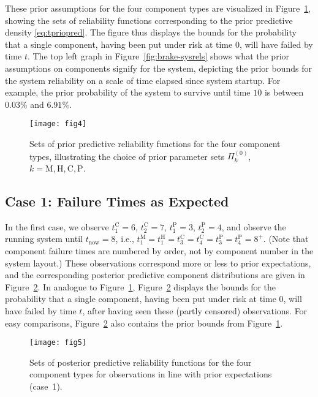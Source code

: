 \documentclass[Journal,letterpaper]{ascelike-new}
\newcommand{\uz}{^{(0)}} %
\def\PkZ{\Pi\uz_k}
\def\tnow{t_\text{now}}
\begin{document}
These prior assumptions for the four component types are visualized in Figure~\ref{fig:brake-comppriors},
showing the sets of reliability functions corresponding to the prior predictive density \eqref{eq:tpriopred}.
The figure thus displays the bounds for the probability that a single component,
having been put under risk at time $0$, will have failed by time $t$.
The top left graph in Figure~\ref{fig:brake-sysrels} shows what the prior assumptions on components
signify for the system, depicting the prior bounds for the system reliability %
on a scale of time elapsed since system startup.
For example, the prior probability of the system to survive until time $10$ is between $0.03$\% and $6.91$\%.

\begin{figure}
\texttt{[image: fig4]}
\caption{Sets of prior predictive reliability functions for the four component types,
illustrating the choice of prior parameter sets $\PkZ$, $k=\text{M}, \text{H}, \text{C}, \text{P}$.}
\label{fig:brake-comppriors}
\end{figure}


\subsection{Case 1: Failure Times as Expected}
\label{sec:ex-case1}

In the first case, we observe $t_1^\text{C} = 6$, $t_2^\text{C} = 7$, $t_1^\text{P} = 3$, $t_2^\text{P} = 4$,
and observe the running system until $\tnow = 8$,
i.e., $t_1^\text{M} = t_1^\text{H} = t_3^\text{C} = t_4^\text{C} = t_3^\text{P} = t_4^\text{P} = 8^+$.
(Note that component failure times are numbered by order, not by component number in the system layout.)
These observations correspond more or less to prior expectations,
and the corresponding posterior predictive component distributions are given in Figure~\ref{fig:comppost-1}.
In analogue to Figure~\ref{fig:brake-comppriors},
Figure~\ref{fig:comppost-1} displays the bounds for the probability that a single component,
having been put under risk at time $0$, will have failed by time $t$,
after having seen these (partly censored) observations.
For easy comparisons, Figure~\ref{fig:comppost-1} also contains the prior bounds from Figure~\ref{fig:brake-comppriors}.

\begin{figure}
\texttt{[image: fig5]}
\caption{Sets of posterior predictive reliability functions for the four component types
for observations in line with prior expectations (case~1).}
\label{fig:comppost-1}
\end{figure}
\end{document}

